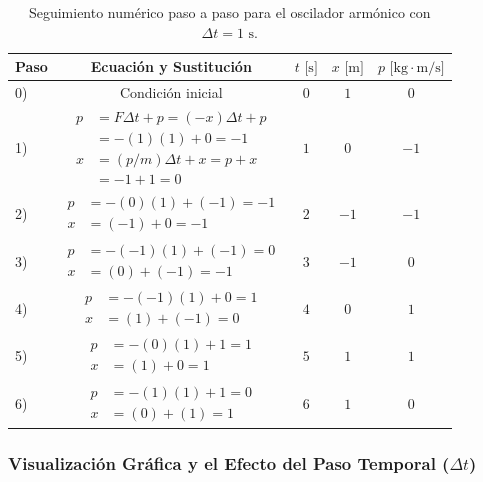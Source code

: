 \documentclass[11pt,a4paper]{book}
\renewcommand{\arraystretch}{1.9}
\begin{document}
\begin{table}[htbp]
\centering
\renewcommand{\arraystretch}{1.3}
\begin{tabular}{|l|c|c|c|c|}
\hline
\textbf{Paso} & \textbf{Ecuación y Sustitución} & $t \text{ [s]}$ & $x \text{ [m]}$ & $p \text{ [kg}\cdot\text{m/s]}$ \\ \hline
0) & Condición inicial & $0$ & $1$ & $0$ \\ \hline
1) & 
$\begin{aligned}
    p &= F\Delta t + p = (-x)\Delta t + p \\
      &= -(1)(1) + 0 = -1 \\
    x &= (p/m)\Delta t + x = p + x \\
      &= -1 + 1 = 0
\end{aligned}$ & $1$ & $0$ & $-1$ \\ \hline
2) & 
$\begin{aligned}
    p &= -(0)(1) + (-1) = -1 \\
    x &= (-1) + 0 = -1
\end{aligned}$ & $2$ & $-1$ & $-1$ \\ \hline
3) & 
$\begin{aligned}
    p &= -(-1)(1) + (-1) = 0 \\
    x &= (0) + (-1) = -1
\end{aligned}$ & $3$ & $-1$ & $0$ \\ \hline
4) & 
$\begin{aligned}
    p &= -(-1)(1) + 0 = 1 \\
    x &= (1) + (-1) = 0
\end{aligned}$ & $4$ & $0$ & $1$ \\ \hline
5) & 
$\begin{aligned}
    p &= -(0)(1) + 1 = 1 \\
    x &= (1) + 0 = 1
\end{aligned}$ & $5$ & $1$ & $1$ \\ \hline
6) & 
$\begin{aligned}
    p &= -(1)(1) + 1 = 0 \\
    x &= (0) + (1) = 1
\end{aligned}$ & $6$ & $1$ & $0$ \\ \hline
\end{tabular}
\caption{Seguimiento numérico paso a paso para el oscilador armónico con $\Delta t = 1 \text{ s}$.}
\label{tab:tabla_oscilador}
\end{table}

\subsubsection{Visualización Gráfica y el Efecto del Paso Temporal ($\Delta t$)}
\end{document}

